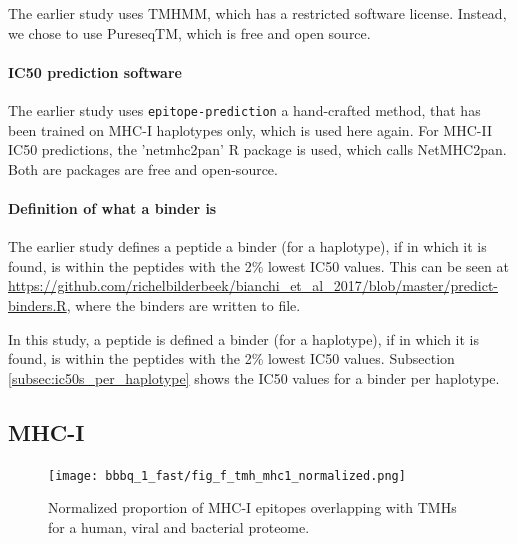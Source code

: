 The earlier study uses TMHMM, which has a restricted software license.
Instead, we chose to use PureseqTM, which is free and open source.



\paragraph{IC50 prediction software}

The earlier study uses \verb;epitope-prediction; a hand-crafted method, 
that has been trained on MHC-I haplotypes only,
which is used here again. For MHC-II IC50 predictions, the
'netmhc2pan' R package is used, which calls NetMHC2pan.
Both are packages are free and open-source.

\paragraph{Definition of what a binder is}

The earlier study defines a peptide a binder (for a haplotype), 
if  in which it is found, 
is within the peptides with the 2\% lowest IC50 values.
This can be seen at \url{https://github.com/richelbilderbeek/bianchi_et_al_2017/blob/master/predict-binders.R},
where the binders are written to file.

In this study, a peptide is defined a binder (for a haplotype), 
if  in which it is found, 
is within the peptides with the 2\% lowest IC50 values.
Subsection \ref{subsec:ic50s_per_haplotype} shows the IC50 values
for a binder per haplotype.

\subsection{MHC-I}

\begin{figure}[!htbp]
  \texttt{[image: bbbq\_1\_fast/fig\_f\_tmh\_mhc1\_normalized.png]}
  \caption{
    Normalized proportion of MHC-I epitopes overlapping with TMHs
    for a human, viral and bacterial proteome.
  }
  \label{fig:f_tmh_mhc1_normalized}
\end{figure}



